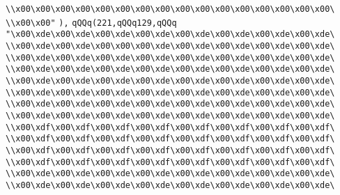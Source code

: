 \verb|\\x00\x00\x00\x00\x00\x00\x00\x00\x00\x00\x00\x00\x00\x00\x00\x00\|\newline
\verb|\\x00\x00"|\newline
\verb|),|\newline
\verb|qQQq(221,qQQq129,qQQq|\newline
\verb|"\x00\xde\x00\xde\x00\xde\x00\xde\x00\xde\x00\xde\x00\xde\x00\xde\|\newline
\verb|\\x00\xde\x00\xde\x00\x00\x00\xde\x00\xde\x00\xde\x00\xde\x00\xde\|\newline
\verb|\\x00\xde\x00\xde\x00\xde\x00\xde\x00\xde\x00\xde\x00\xde\x00\xde\|\newline
\verb|\\x00\xde\x00\xde\x00\xde\x00\xde\x00\xde\x00\xde\x00\xde\x00\xde\|\newline
\verb|\\x00\xde\x00\xde\x00\xde\x00\xde\x00\xde\x00\xde\x00\xde\x00\xde\|\newline
\verb|\\x00\xde\x00\xde\x00\xde\x00\xde\x00\xde\x00\xde\x00\xde\x00\xde\|\newline
\verb|\\x00\xde\x00\xde\x00\xde\x00\xde\x00\xde\x00\xde\x00\xde\x00\xde\|\newline
\verb|\\x00\xde\x00\xde\x00\xde\x00\xde\x00\xde\x00\xde\x00\xde\x00\xde\|\newline
\verb|\\x00\xdf\x00\xdf\x00\xdf\x00\xdf\x00\xdf\x00\xdf\x00\xdf\x00\xdf\|\newline
\verb|\\x00\xdf\x00\xdf\x00\xdf\x00\xdf\x00\xdf\x00\xdf\x00\xdf\x00\xdf\|\newline
\verb|\\x00\xdf\x00\xdf\x00\xdf\x00\xdf\x00\xdf\x00\xdf\x00\xdf\x00\xdf\|\newline
\verb|\\x00\xdf\x00\xdf\x00\xdf\x00\xdf\x00\xdf\x00\xdf\x00\xdf\x00\xdf\|\newline
\verb|\\x00\xde\x00\xde\x00\xde\x00\xde\x00\xde\x00\xde\x00\xde\x00\xde\|\newline
\verb|\\x00\xde\x00\xde\x00\xde\x00\xde\x00\xde\x00\xde\x00\xde\x00\xde\|\newline
